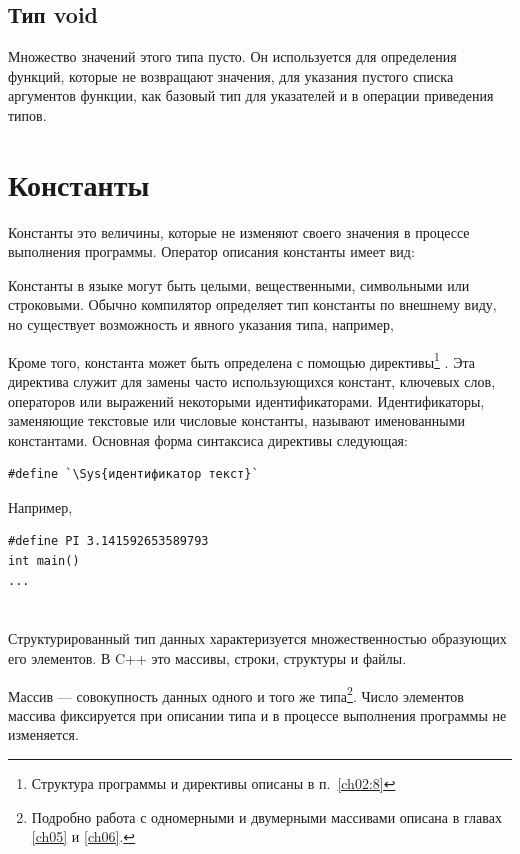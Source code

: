 \subsection[Тип void]{Тип void}
Множество значений этого типа пусто. Он используется для определения функций, которые не возвращают значения, для
указания пустого списка аргументов функции, как базовый тип для указателей и в операции приведения типов.

\section[Константы]{Константы}
Константы это величины, которые не изменяют своего значения в процессе выполнения
программы. Оператор описания константы имеет вид:


Константы в языке  могут быть целыми, вещественными, символьными или строковыми. Обычно компилятор определяет тип
константы по внешнему виду, но существует возможность и явного указания типа, например,


Кроме того, константа может быть определена с помощью директивы\footnote{Структура программы и директивы описаны в
п.~\ref{ch02:8}}
. Эта директива служит для замены часто использующихся констант, ключевых слов,
операторов или выражений некоторыми идентификаторами. Идентификаторы, заменяющие текстовые или числовые константы,
называют {именованными константами}. Основная форма синтаксиса директивы следующая:
\begin{lstlisting}
#define `\Sys{идентификатор текст}`
\end{lstlisting}

Например, 
\begin{lstlisting}
#define PI 3.141592653589793
int main()
...
\end{lstlisting}

\section[Структурированные типы данных]{}
Структурированный тип данных характеризуется множественностью
образующих его элементов. В C++ это массивы, строки, структуры и файлы.

Массив --- совокупность данных одного и того же типа\footnote{Подробно работа с
одномерными и двумерными массивами описана в главах \ref{ch05} и \ref{ch06}.}. Число элементов массива 
фиксируется при описании типа и в
процессе выполнения программы не изменяется.

